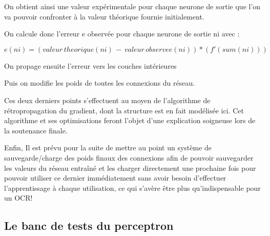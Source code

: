 \documentclass[a4paper,10pt]{report}
\begin{document}
On obtient ainsi une valeur exp\'erimentale pour chaque neurone de
sortie que l'on va pouvoir confronter \`a la valeur th\'eorique fournie
initialement.

On calcule donc l'erreur e observ\'ee pour chaque neurone de sortie ni avec :

\[
	e(ni) = (valeur\, theorique(ni)\, -\, valeur\, observee(ni))*(f'(sum(ni)))
\]


On propage ensuite l'erreur vers les couches intérieures 

Puis on modifie les poids de toutes les connexions du réseau.

Ces deux derniers points s'effectuent au moyen de l'algorithme de
r\'etropropagation du gradient, dont la structure est en fait
mod\'elis\'ee ici. Cet algorithme et ses optimisations feront l'objet
d'une explication soigneuse lors de la soutenance finale.


Enfin, Il est pr\'evu pour la suite de mettre au point un syst\`eme de
sauvegarde/charge des poids finaux des connexions afin de pouvoir
sauvegarder les valeurs du r\'eseau entra\^iné et les charger
directement une prochaine fois pour pouvoir utiliser ce dernier
imm\'ediatement sans avoir besoin d'effectuer l'apprentissage \`a chaque
utilisation, ce qui s'av\`ere \^etre plus qu'indispensable pour un OCR!




\subsection{Le banc de tests du perceptron} %
\label{subsec:le_banc_de_tests_du_perceptron}
\end{document}
